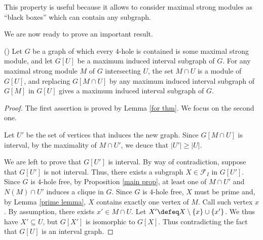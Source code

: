\documentclass{article}
\begin{document}
    This property is useful because
    it allows to consider maximal
    strong modules as
    ``black boxes''
    which can contain any subgraph. 
    
    We are now ready to prove an
    important result.
    
    \begin{thm} (\cite{main}) \label{replacing thm}
        Let $G$ be a graph of which
        every $4$-hole is contained
        is some maximal strong module,
        and let $G\left[U\right]$ be a
        maximum induced interval
        subgraph of $G$.
        For any maximal strong module
        $M$ of $G$ intersecting $U$,
        the set $M \cap U$ is a module
        of $G\left[U\right]$, 
        and replacing $G\left[M \cap U \right]$ 
        by any maximum induced 
        interval subgraph of $G\left[M\right]$ 
        in $G\left[U\right]$ 
        gives a maximum induced interval
        subgraph of $G$.
    \end{thm}
    \begin{proof}
        The first assertion is proved
        by Lemma \ref{for thm}.
        We focus on the second one.

        Let $U'$  be the set of 
        vertices that induces the new graph.
        Since $G\left[M \cap U\right]$ is
        interval, by the maximality of
        $M \cap U'$, we deuce that
        $\left|U'\right| \geq \left|U\right|$.

        We are left to prove that
        $G\left[U'\right]$ is interval.
        By way of contradiction,
        suppose that $G\left[U'\right]$ 
        is not interval.
        Thus, there exists a
        subgraph $X \in \mathcal{F}_{I}$
        in $G\left[U'\right]$.
        Since $G$ is $4$-hole free, 
        by Proposition \ref{main prop},
        at least one of $M \cap U'$ 
        and $N\left(M\right) \cap U'$ 
        induces a clique in $G$.
        Since $G$ is $4$-hole free,
        $X$ must be prime and,
        by Lemma \ref{prime lemma},
        $X$ contains exactly
        one vertex of $M$.
        Call such vertex $x$.
        By assumption, 
        there exists $x' \in M \cap U$.
        Let $X' \defeq X \setminus \left\{x\right\} \cup \left\{x'\right\}$.
        We thus have $X' \subseteq U$,
        but $G\left[X'\right]$ is 
        isomorphic to $G\left[X\right]$.
        Thus contradicting the fact
        that $G\left[U\right]$ is an
        interval graph.
    \end{proof}
\end{document}
